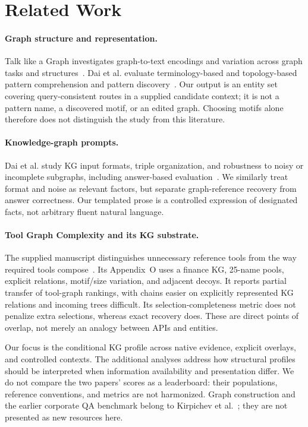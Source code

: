\section{Related Work}
\label{sec:related}
\paragraph{Graph structure and representation.}
Talk like a Graph investigates graph-to-text encodings and variation across graph tasks and structures~\cite{fatemi2024talklikegraph}. Dai et al. evaluate terminology-based and topology-based pattern comprehension and pattern discovery~\cite{dai2025graphpatterns}. Our output is an entity set covering query-consistent routes in a supplied candidate context; it is not a pattern name, a discovered motif, or an edited graph. Choosing motifs alone therefore does not distinguish the study from this literature.

\paragraph{Knowledge-graph prompts.}
Dai et al. study KG input formats, triple organization, and robustness to noisy or incomplete subgraphs, including answer-based evaluation~\cite{dai2024kgunderstanding}. We similarly treat format and noise as relevant factors, but separate graph-reference recovery from answer correctness. Our templated prose is a controlled expression of designated facts, not arbitrary fluent natural language.

\paragraph{Tool Graph Complexity and its KG substrate.}
The supplied manuscript distinguishes unnecessary reference tools from the way required tools compose~\cite{anonymousToolGraph}. Its Appendix~O uses a finance KG, 25-name pools, explicit relations, motif/size variation, and adjacent decoys. It reports partial transfer of tool-graph rankings, with chains easier on explicitly represented KG relations and incoming trees difficult. Its selection-completeness metric does not penalize extra selections, whereas exact recovery does. These are direct points of overlap, not merely an analogy between APIs and entities.

Our focus is the conditional KG profile across native evidence, explicit overlays, and controlled contexts. The additional analyses address how structural profiles should be interpreted when information availability and presentation differ. We do not compare the two papers' scores as a leaderboard: their populations, reference conventions, and metrics are not harmonized. Graph construction and the earlier corporate QA benchmark belong to Kirpichev et al.~\cite{kirpichev2026towards}; they are not presented as new resources here.
